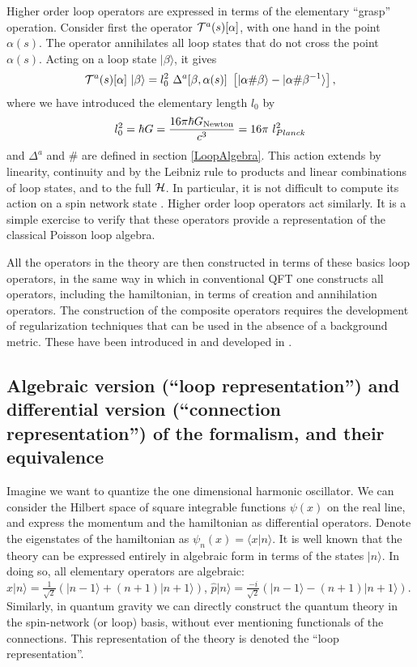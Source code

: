 Higher order loop operators are expressed in terms of the 
elementary ``grasp'' operation.  Consider first the operator 
${\cal T}^{a}(s)[\alpha]$, with one hand in the point 
$\alpha(s)$. The operator annihilates all loop states that do 
not cross the point $\alpha(s)$. Acting on a loop state 
$|\beta\rangle$, it gives
\begin{equation}
	{\cal T}^{a}(s)[\alpha]\ |\beta\rangle=
	 l^2_0 \ \Delta^a[\beta,\alpha(s)] \ 
     \left[ |\alpha\#\beta\rangle - |\alpha\#\beta^{-1}\rangle 
     \right],
\label{t11}
\end{equation}
where we have introduced the elementary length $l_0$ by
\begin{equation}
 l^2_0 = \hbar G = \frac{16 \pi \hbar G_{{\rm Newton}}}{c^3} 
 = 16 \pi\ l^2_{Planck}
\end{equation}
and $\Delta^a$ and $\#$ are defined in section \ref{LoopAlgebra}.  
This action extends by linearity, continuity and by the Leibniz 
rule to products and linear combinations of loop states, and to 
the full $\cal H$.  In particular, it is not difficult to compute 
its action on a spin network state \cite{DePietriRovelli}.  
Higher order loop operators act similarly.  It is a simple 
exercise to verify that these operators provide a representation 
of the classical Poisson loop algebra.

All the operators in the theory are then constructed in terms of 
these basics loop operators, in the same way in which in 
conventional QFT one constructs all operators, including the 
hamiltonian, in terms of creation and annihilation operators.  
The construction of the composite operators requires the 
development of regularization techniques that can be used in the 
absence of a background metric.  These have been introduced in 
\cite{Smolin93} and developed in 
\cite{RovelliSmolin95,DePietriRovelli,AshtekarEtAl95,%
weave,LewandowskiArea,AshtekarLewandowskiArea2}.  


\subsection{Algebraic version (``loop representation'') and 
differential version (``connection representation'')  of the 
formalism, and their equivalence}

Imagine we want to quantize the one dimensional harmonic oscillator.  
We can consider the Hilbert space of square integrable functions 
$\psi(x)$ on the real line, and express the momentum and the 
hamiltonian as differential operators.  Denote the 
eigenstates of the hamiltonian as $\psi_{n}(x)=\langle x| n\rangle$.  
It is well known that the theory can be expressed entirely in 
algebraic form in terms of the states $|n\rangle$.  In doing so, all 
elementary operators are algebraic: $ \hat x |n\rangle = 
\frac{1}{\sqrt{2}}(|n-1\rangle + (n+1) |n+1\rangle)$, $ \hat p 
|n\rangle = \frac{-i}{\sqrt{2}}(|n-1\rangle - (n+1) |n+1\rangle)$.  
Similarly, in quantum gravity we can directly construct the quantum 
theory in the spin-network (or loop) basis, without ever mentioning 
functionals of the connections.  This representation of the theory is 
denoted the ``loop representation''.

